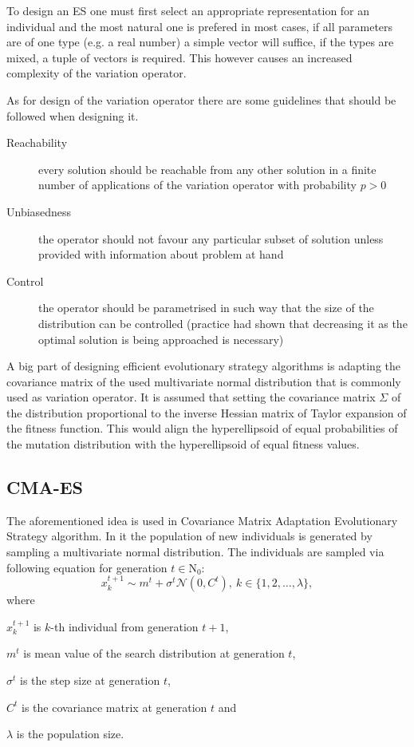 To design an ES one must first select an appropriate representation for an individual and the most natural one is prefered in most cases, if all parameters are of one type (e.g. a real number) a simple vector will suffice, if the types are mixed, a tuple of vectors is required. This however causes an increased complexity of the variation operator.

As for design of the variation operator there are some guidelines that should be followed when designing it.
\begin{description}
    \item[Reachability] every solution should be reachable from any other solution in a finite number of applications of the variation operator with probability $p > 0$
    \item[Unbiasedness] the operator should not favour any particular subset of solution unless provided with information about problem at hand
    \item[Control] the operator should be parametrised in such way that the size of the distribution can be controlled (practice had shown that decreasing it as the optimal solution is being approached is necessary) 
\end{description}

A big part of designing efficient evolutionary strategy algorithms is adapting the covariance matrix of the used multivariate normal distribution that is commonly used as variation operator. It is assumed that setting the covariance matrix $\Sigma$ of the distribution proportional to the inverse Hessian matrix of Taylor expansion of the fitness function. This would align the hyperellipsoid of equal probabilities of the mutation distribution with the hyperellipsoid of equal fitness values.\cite{Schwefel1995}\cite{Rudolph2012}

\subsection{CMA-ES}
\label{subsec:cma-es}
The aforementioned idea is used in Covariance Matrix Adaptation Evolutionary Strategy algorithm. In it the population of new individuals is generated by sampling a multivariate normal distribution. The individuals are sampled via following equation for generation $t \in \mathrm{N}_0$:
\begin{equation}
    x_k^{t+1} \sim m^t + \sigma^t\mathcal{N}(0,C^t),\ k\in \{1,2,\dots,\lambda\}, 
\end{equation}
where 
\begin{description}
    \item $x_k^{t+1}$ is $k$-th individual from generation $t+1$, 
    \item $m^t$ is mean value of the search distribution at generation $t$,
    \item $\sigma^t$ is the step size at generation $t$,
    \item $C^t$ is the covariance matrix at generation $t$ and
    \item $\lambda$ is the population size.
\end{description}

